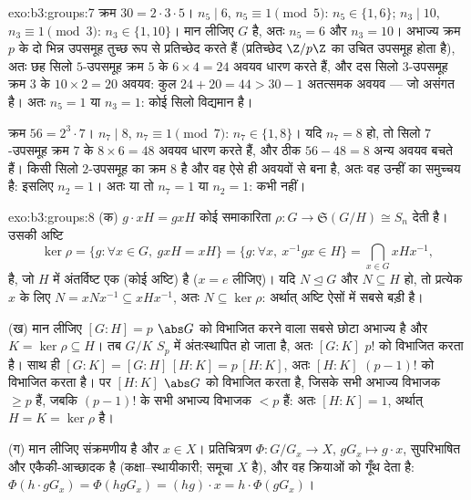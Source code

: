 \begin{solution}{exo:b3:groups:7}
क्रम $30 = 2 \cdot 3 \cdot 5$। $n_5 \mid 6$, $n_5 \equiv 1 \pmod
5$: $n_5 \in \{1, 6\}$; $n_3 \mid 10$, $n_3 \equiv 1 \pmod 3$: $n_3 \in \{1, 10\}$। मान लीजिए
$G$  है, अतः $n_5 = 6$ और $n_3 =
10$। अभाज्य क्रम $p$ के दो भिन्न
उपसमूह तुच्छ रूप से प्रतिच्छेद करते हैं (प्रतिच्छेद $\Z/p\Z$ का उचित
उपसमूह होता है), अतः छह सिलो $5$-उपसमूह क्रम $5$ के $6 \times 4 = 24$ अवयव
धारण करते हैं, और दस सिलो $3$-उपसमूह क्रम $3$ के $10 \times 2 = 20$ अवयव:
कुल $24 + 20 = 44 > 30 - 1$ अतत्समक अवयव --- जो असंगत है। अतः $n_5 = 1$ या $n_3 = 1$: कोई
 सिलो विद्यमान है।

क्रम $56 = 2^3 \cdot 7$। $n_7 \mid 8$, $n_7 \equiv 1 \pmod 7$: $n_7 \in \{1, 8\}$। यदि $n_7 = 8$ हो, तो सिलो
$7$-उपसमूह क्रम $7$ के $8
\times 6 = 48$ अवयव धारण करते हैं, और ठीक $56 - 48 =
8$
अन्य अवयव बचते हैं। किसी सिलो $2$-उपसमूह का क्रम $8$ है और वह
ऐसे ही अवयवों से बना है, अतः वह उन्हीं का समुच्चय है: इसलिए $n_2 = 1$।
अतः या तो $n_7 = 1$ या $n_2 = 1$: कभी  नहीं।
\end{solution}

\begin{solution}{exo:b3:groups:8}
(क)  $g \cdot xH = gxH$ कोई समाकारिता $\rho \colon G
\to \mathfrak S(G/H) \cong S_n$ देती है। उसकी अष्टि
\[
\ker\rho = \{g : \forall x \in G,\ gxH = xH\}
= \{g : \forall x,\ x^{-1}gx \in H\}
= \bigcap_{x \in G} xHx^{-1},
\]
है, जो $H$ में अंतर्विष्ट एक  (कोई अष्टि) है
($x = e$ लीजिए)। यदि $N \trianglelefteq G$ और $N \subseteq H$ हो, तो प्रत्येक $x$ के लिए
$N
= xNx^{-1} \subseteq xHx^{-1}$, अतः $N \subseteq \ker\rho$: अर्थात् अष्टि ऐसों में सबसे बड़ी है।

(ख) मान लीजिए $[G:H] = p$ $\abs G$ को विभाजित करने वाला सबसे छोटा अभाज्य है
और $K =
\ker\rho \subseteq H$। तब $G/K$ $S_p$ में अंतःस्थापित हो जाता है, अतः $[G:K]$
$p!$ को विभाजित करता है। साथ ही $[G:K] = [G:H]\,[H:K] = p\,[H:K]$, अतः $[H:K]$ $(p-1)!$ को विभाजित
करता है। पर $[H:K]$ $\abs G$ को विभाजित करता है, जिसके सभी अभाज्य विभाजक
$\geq p$ हैं, जबकि $(p-1)!$ के सभी अभाज्य विभाजक $< p$ हैं: अतः $[H:K] = 1$,
अर्थात् $H = K = \ker \rho$  है।

(ग) मान लीजिए  संक्रमणीय है और $x \in X$। प्रतिचित्रण $\Phi
\colon G/G_x \to X$, $gG_x \mapsto g \cdot x$,
सुपरिभाषित और एकैकी-आच्छादक है (कक्षा--स्थायीकारी;  समूचा $X$
है), और वह क्रियाओं को गूँथ देता है: $\Phi(h \cdot gG_x) = \Phi(hgG_x) = (hg)
\cdot x = h \cdot \Phi(gG_x)$।
\end{solution}

